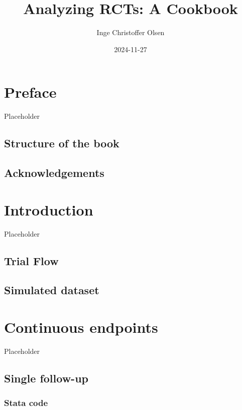 \documentclass[
]{book}
\title{Analyzing RCTs: A Cookbook}
\author{Inge Christoffer Olsen}
\date{2024-11-27}
\begin{document}
\maketitle

{
\setcounter{tocdepth}{1}
\tableofcontents
}
\chapter{Preface}\label{preface}

Placeholder

\section{Structure of the book}\label{structure-of-the-book}

\section{Acknowledgements}\label{acknowledgements}

\chapter{Introduction}\label{intro}

Placeholder

\section{Trial Flow}\label{trial-flow}

\section{Simulated dataset}\label{simulated-dataset}

\chapter{Continuous endpoints}\label{continuous-endpoints}

Placeholder

\section{Single follow-up}\label{single-follow-up}

\subsection{Stata code}\label{stata-code}
\end{document}
